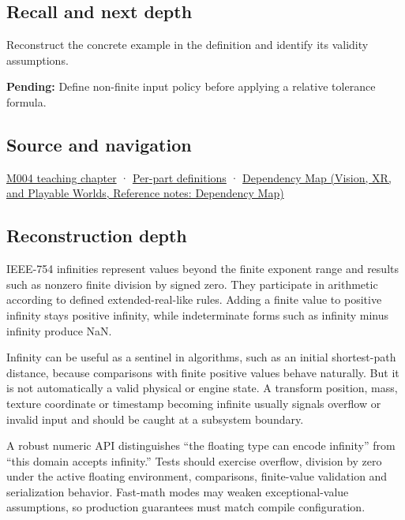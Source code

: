 \subsection{Recall and next depth}\label{appendix-eb336149c00a-recall-and-next-depth}

\hypertarget{appendix-eb336149c00a-recall-and-next-depth}{}

Reconstruct the concrete example in the definition and identify its validity assumptions.

\textbf{Pending:} Define non-finite input policy before applying a relative tolerance formula.

\subsection{Source and navigation}\label{appendix-eb336149c00a-source-and-navigation}

\hypertarget{appendix-eb336149c00a-source-and-navigation}{}

\hyperref[01-foundations-i-ch001-a-stretching-ruler-for-real-valued-quantities]{M004 teaching chapter} · \hyperref[appendix-fd090d982a15-m004---parts-61-76]{Per-part definitions} · \href{../07-Vision-XR-and-Playable-Worlds/main.pdf\#nameddest=appendix-4ad47bdd269a}{Dependency Map (Vision, XR, and Playable Worlds, Reference notes: Dependency Map)}

\subsection{Reconstruction depth}\label{appendix-eb336149c00a-reconstruction-depth}

\hypertarget{appendix-eb336149c00a-reconstruction-depth}{}

IEEE-754 infinities represent values beyond the finite exponent range and results such as nonzero finite division by signed zero. They participate in arithmetic according to defined extended-real-like rules. Adding a finite value to positive infinity stays positive infinity, while indeterminate forms such as infinity minus infinity produce NaN.

Infinity can be useful as a sentinel in algorithms, such as an initial shortest-path distance, because comparisons with finite positive values behave naturally. But it is not automatically a valid physical or engine state. A transform position, mass, texture coordinate or timestamp becoming infinite usually signals overflow or invalid input and should be caught at a subsystem boundary.

A robust numeric API distinguishes ``the floating type can encode infinity'' from ``this domain accepts infinity.'' Tests should exercise overflow, division by zero under the active floating environment, comparisons, finite-value validation and serialization behavior. Fast-math modes may weaken exceptional-value assumptions, so production guarantees must match compile configuration.
